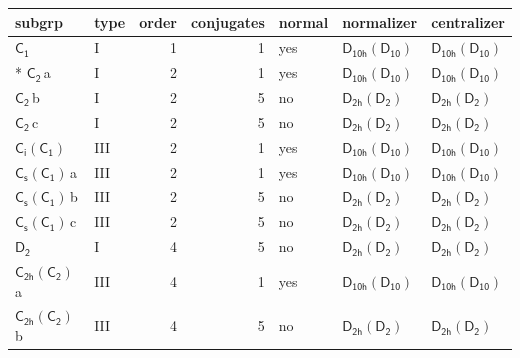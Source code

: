 \documentclass[10pt,a4paper]{article}
\numberwithin{equation}{section}
\newcommand{\grp}[1]{\mathsf{#1}}
\newcommand{\clsletter}[1]{\,{\scriptsize\color{black!55}#1}}
\begin{document}
{\small\begin{longtable}{@{}llrrlll@{}}\toprule
subgrp & type & order & conjugates & normal & normalizer & centralizer\\\midrule\endhead
\bottomrule\endfoot\endlastfoot
\href{../../../rotation/data/pdf/C1.pdf}{$\grp{C_{1}}$} & I & 1 & 1 & yes & \href{D10h-D10.pdf}{$\grp{D_{10h}}(\grp{D_{10}})$} & \href{D10h-D10.pdf}{$\grp{D_{10h}}(\grp{D_{10}})$}\\*
\href{../../../rotation/data/pdf/C2.pdf}{$\grp{C_{2}}$}\clsletter{a} & I & 2 & 1 & yes & \href{D10h-D10.pdf}{$\grp{D_{10h}}(\grp{D_{10}})$} & \href{D10h-D10.pdf}{$\grp{D_{10h}}(\grp{D_{10}})$}\\
\href{../../../rotation/data/pdf/C2.pdf}{$\grp{C_{2}}$}\clsletter{b} & I & 2 & 5 & no & \href{D2h-D2.pdf}{$\grp{D_{2h}}(\grp{D_{2}})$} & \href{D2h-D2.pdf}{$\grp{D_{2h}}(\grp{D_{2}})$}\\
\href{../../../rotation/data/pdf/C2.pdf}{$\grp{C_{2}}$}\clsletter{c} & I & 2 & 5 & no & \href{D2h-D2.pdf}{$\grp{D_{2h}}(\grp{D_{2}})$} & \href{D2h-D2.pdf}{$\grp{D_{2h}}(\grp{D_{2}})$}\\
\href{S2-C1.pdf}{$\grp{C_{i}}(\grp{C_{1}})$} & III & 2 & 1 & yes & \href{D10h-D10.pdf}{$\grp{D_{10h}}(\grp{D_{10}})$} & \href{D10h-D10.pdf}{$\grp{D_{10h}}(\grp{D_{10}})$}\\
\href{C1v-C1.pdf}{$\grp{C_{s}}(\grp{C_{1}})$}\clsletter{a} & III & 2 & 1 & yes & \href{D10h-D10.pdf}{$\grp{D_{10h}}(\grp{D_{10}})$} & \href{D10h-D10.pdf}{$\grp{D_{10h}}(\grp{D_{10}})$}\\
\href{C1v-C1.pdf}{$\grp{C_{s}}(\grp{C_{1}})$}\clsletter{b} & III & 2 & 5 & no & \href{D2h-D2.pdf}{$\grp{D_{2h}}(\grp{D_{2}})$} & \href{D2h-D2.pdf}{$\grp{D_{2h}}(\grp{D_{2}})$}\\
\href{C1v-C1.pdf}{$\grp{C_{s}}(\grp{C_{1}})$}\clsletter{c} & III & 2 & 5 & no & \href{D2h-D2.pdf}{$\grp{D_{2h}}(\grp{D_{2}})$} & \href{D2h-D2.pdf}{$\grp{D_{2h}}(\grp{D_{2}})$}\\
\href{../../../rotation/data/pdf/D2.pdf}{$\grp{D_{2}}$} & I & 4 & 5 & no & \href{D2h-D2.pdf}{$\grp{D_{2h}}(\grp{D_{2}})$} & \href{D2h-D2.pdf}{$\grp{D_{2h}}(\grp{D_{2}})$}\\
\href{C2h-C2.pdf}{$\grp{C_{2h}}(\grp{C_{2}})$}\clsletter{a} & III & 4 & 1 & yes & \href{D10h-D10.pdf}{$\grp{D_{10h}}(\grp{D_{10}})$} & \href{D10h-D10.pdf}{$\grp{D_{10h}}(\grp{D_{10}})$}\\
\href{C2h-C2.pdf}{$\grp{C_{2h}}(\grp{C_{2}})$}\clsletter{b} & III & 4 & 5 & no & \href{D2h-D2.pdf}{$\grp{D_{2h}}(\grp{D_{2}})$} & \href{D2h-D2.pdf}{$\grp{D_{2h}}(\grp{D_{2}})$}\\

\end{longtable}}
\end{document}
